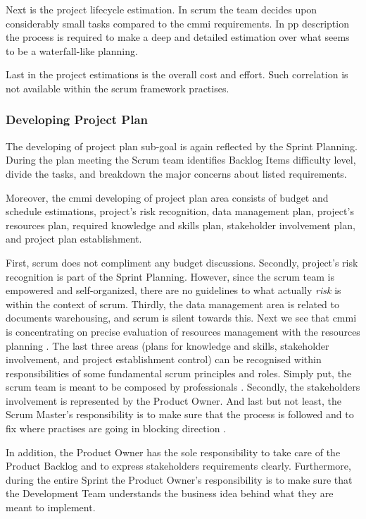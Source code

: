 Next is the project lifecycle estimation. In \ac{scrum} the team decides upon considerably small tasks compared to the \acs{cmmi} requirements. In \acs{pp} description the process is required to make a deep and detailed estimation over what seems to be a waterfall-like planning. 

Last in the project estimations is the overall cost and effort. Such correlation is not available within the \ac{scrum} framework practises.

\subsubsection{Developing Project Plan}
The developing of project plan sub-goal is again reflected by the Sprint Planning. During the plan meeting the Scrum team identifies Backlog Items difficulty level, divide the tasks, and breakdown the major concerns about listed requirements. 

Moreover, the \acs{cmmi} developing of project plan area consists of budget and schedule estimations, project's risk recognition, data management plan, project's resources plan, required knowledge and skills plan, stakeholder involvement plan, and project plan establishment. 

First, \ac{scrum} does not compliment any budget discussions. Secondly, project's risk recognition is part of the Sprint Planning. However, since the \ac{scrum} team is empowered and self-organized, there are no guidelines to what actually \textit{risk} is within the context of \ac{scrum}. Thirdly, the data management area is related to documents warehousing, and \ac{scrum} is silent towards this. Next we see that \ac{cmmi} is concentrating on precise evaluation of resources management with the resources planning \citep[page 293]{team2010cmmi}. The last three areas (plans for knowledge and skills, stakeholder involvement, and project establishment control) can be recognised within responsibilities of some fundamental \ac{scrum} principles and roles. Simply put, the \ac{scrum} team is meant to be composed by professionals \citep[page 5]{schwaber2011scrum}. Secondly, the stakeholders involvement is represented by the Product Owner. And last but not least, the Scrum Master's responsibility is to make sure that the process is followed and to fix where practises are going in blocking direction \citep[page 6]{schwaber2011scrum}.

In addition, the Product Owner has the sole responsibility to take care of the Product Backlog and to express stakeholders requirements clearly. Furthermore, during the entire Sprint the Product Owner's responsibility is to make sure that the Development Team understands the business idea behind what they are meant to implement.

